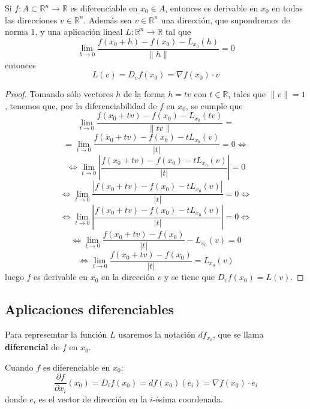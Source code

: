 \begin{teorema}
    Si $f: A \subset \mathbb{R}^n \to \mathbb{R}$ es diferenciable en $x_0\in A$, entonces es derivable en $x_0$ en todas las direcciones $v\in\mathbb{R}^n$. Además sea $v \in \mathbb{R}^n$ una dirección, que supondremos de norma $1$, y una aplicación lineal $L:\mathbb{R}^n\to\mathbb{R}$ tal que
    $$\lim_{h \to 0} \frac{f(x_0 + h) - f(x_0) - L_{x_0}(h)}{\|h\|} = 0$$
    entonces
    $$ L(v) = D_vf(x_0) = \nabla f(x_0) \cdot v $$
\end{teorema}
\begin{proof}
    Tomando sólo vectores $h$ de la forma $h = tv$ con $t \in \mathbb{R}$, tales que $\|v\| = 1$, tenemos que, por la diferenciabilidad de $f$ en $x_0$, se cumple que
    $$\lim_{t \to 0} \frac{f(x_0 + tv) - f(x_0) - L_{x_0}(tv)}{\|tv\|} = $$
    $$ = \lim_{t \to 0} \frac{f(x_0 + tv) - f(x_0) - tL_{x_0}(v)}{|t|} = 0 \iff$$
    $$\iff \lim_{t \to 0} \left| \frac{f(x_0 + tv) - f(x_0) - tL_{x_0}(v)}{|t|} \right| = 0$$
    $$\iff \lim_{t \to 0} \frac{|f(x_0 + tv) - f(x_0) - tL_{x_0}(v)|}{|t|} = 0 \iff$$
    $$\iff \lim_{t \to 0} \left| \frac{f(x_0 + tv) - f(x_0) - tL_{x_0}(v)}{|t|}  \right| = 0 \iff$$
    $$\iff \lim_{t \to 0} \frac{f(x_0 + tv) - f(x_0)}{|t|} - L_{x_0}(v) = 0$$ 
    $$\iff \lim_{t \to 0} \frac{f(x_0 + tv) - f(x_0)}{|t|} = L_{x_0}(v)$$
    luego $f$ es derivable en $x_0$ en la dirección $v$ y se tiene que $D_vf(x_0)= L(v)$.

\end{proof}

\subsection{Aplicaciones diferenciables}

\begin{definición}[Diferencial]
    Para represemtar la función $L$ usaremos la notación $df_{x_0}$, que se llama \textbf{diferencial} de $f$ en $x_0$. \\
\end{definición}
\begin{observación}
    Cuando $f$ es diferenciable en $x_0$:
    $$ \frac{\partial f}{\partial x_i}(x_0) = D_{i}f(x_0) = df(x_0)(e_i) = \nabla f(x_0) \cdot e_i $$
    donde $e_i$ es el vector de dirección en la $i$-ésima coordenada. 
\end{observación}

